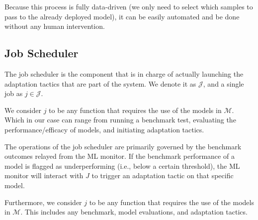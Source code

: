 \documentclass[../main.tex]{subfiles}
\begin{document}

    

    Because this process is fully data-driven (we only need to select which samples to pass to the already deployed model), it can be easily automated and be done without any human intervention. 
    


    \vspace{-0.6cm}
    
    \subsection{Job Scheduler} \label{sec:job_scheduler} 

    The job scheduler is the component that is in charge of actually launching the adaptation tactics that are part of the system. We denote it as $\mathcal{J}$, and a single job as $j \in \mathcal{J}$. 

    We consider $j$ to be any function that requires the use of the models in $\mathcal{M}$. Which in our case can range from running a benchmark test, evaluating the performance/efficacy of models, and initiating adaptation tactics.

    The operations of the job scheduler are primarily governed by the benchmark outcomes relayed from the ML monitor. If the benchmark performance of a model is flagged as underperforming (i.e., below a certain threshold), the ML monitor will interact with $J$ to trigger an adaptation tactic on that specific model.

    Furthermore, we consider $j$ to be any function that requires the use of the models in $\mathcal{M}$. This includes any benchmark, model evaluations, and adaptation tactics.
    
\end{document}
